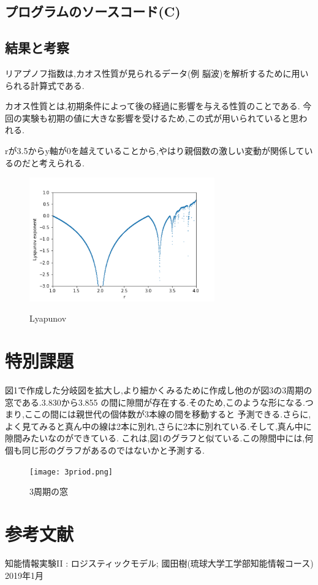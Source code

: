 \documentclass[a4paper,11pt,titlepage]{jarticle}
\begin{document}
\subsection{プログラムのソースコード(C)}

\subsection{結果と考察}
リアプノフ指数は,カオス性質が見られるデータ(例 脳波)を解析するために用いられる計算式である.\par
カオス性質とは,初期条件によって後の経過に影響を与える性質のことである.
今回の実験も初期の値に大きな影響を受けるため,この式が用いられていると思われる.\par
rが3.5からy軸が0を越えていることから,やはり親個数の激しい変動が関係しているのだと考えられる.
\begin{figure}[htbp]
  \centering
  \includegraphics[width=80mm]{x_lyapunov.png}
  \label{Lyapunov}\\
  \caption{Lyapunov}
\end{figure}

\section{特別課題}
図1で作成した分岐図を拡大し,より細かくみるために作成し他のが図3の3周期の窓である.3.830から3.855
の間に隙間が存在する.そのため,このような形になる.つまり,ここの間には親世代の個体数が3本線の間を移動すると
予測できる.さらに,よく見てみると真ん中の線は2本に別れ,さらに2本に別れている.そして,真ん中に隙間みたいなのができている.
これは,図1のグラフと似ている.この隙間中には,何個も同じ形のグラフがあるのではないかと予測する.

\begin{figure}[htbp]
  \centering
  \texttt{[image: 3priod.png]}
  \label{3周期の窓}\\
  \caption{3周期の窓}
\end{figure}

\section{参考文献}
\begin{thebibliography}{99}
	 知能情報実験II : ロジスティックモデル; 國田樹(琉球大学工学部知能情報コース) 2019年1月
\end{thebibliography}
\end{document}

